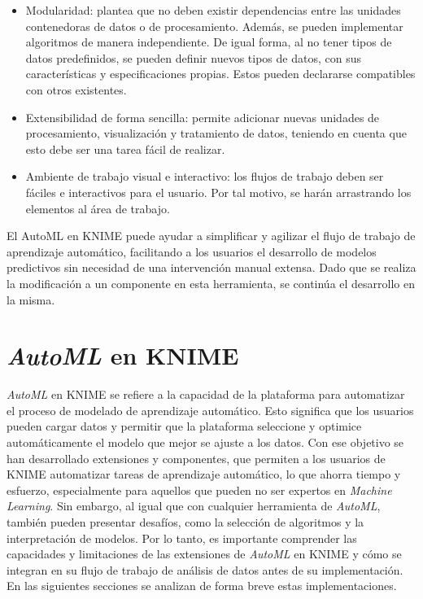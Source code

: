 \begin{itemize}
	\item Modularidad: plantea que no deben existir dependencias entre las unidades contenedoras de datos o de procesamiento. Además, se pueden implementar algoritmos de manera independiente. De igual forma, al no tener tipos de datos predefinidos, se pueden definir nuevos tipos de datos, con sus características y especificaciones propias. Estos pueden declararse compatibles con otros existentes.
	\item	Extensibilidad de forma sencilla: permite adicionar nuevas unidades de procesamiento, visualización y tratamiento de datos, teniendo en cuenta que esto debe ser una tarea fácil de realizar.
	\item	Ambiente de trabajo visual e interactivo: los flujos de trabajo deben ser fáciles e interactivos para el usuario. Por tal motivo, se harán arrastrando los elementos al área de trabajo.
\end{itemize}

El AutoML en KNIME puede ayudar a simplificar y agilizar el flujo de trabajo de aprendizaje automático, facilitando a los usuarios el desarrollo de modelos predictivos sin necesidad de una intervención manual extensa. Dado que se realiza la modificación a un componente en esta herramienta, se continúa el desarrollo en la misma.

\section{\textit{AutoML} en KNIME}
\textit{AutoML} en KNIME se refiere a la capacidad de la plataforma para automatizar el proceso de modelado de aprendizaje automático. Esto significa que los usuarios pueden cargar datos y permitir que la plataforma seleccione y optimice automáticamente el modelo que mejor se ajuste a los datos. Con ese objetivo se han desarrollado extensiones y componentes, que permiten a los usuarios de KNIME automatizar tareas de aprendizaje automático, lo que ahorra tiempo y esfuerzo, especialmente para aquellos que pueden no ser expertos en \textit{Machine Learning}. Sin embargo, al igual que con cualquier herramienta de \textit{AutoML}, también pueden presentar desafíos, como la selección de algoritmos y la interpretación de modelos. Por lo tanto, es importante comprender las capacidades y limitaciones de las extensiones de \textit{AutoML} en KNIME y cómo se integran en su flujo de trabajo de análisis de datos antes de su implementación. En las siguientes secciones se analizan de forma breve estas implementaciones.


